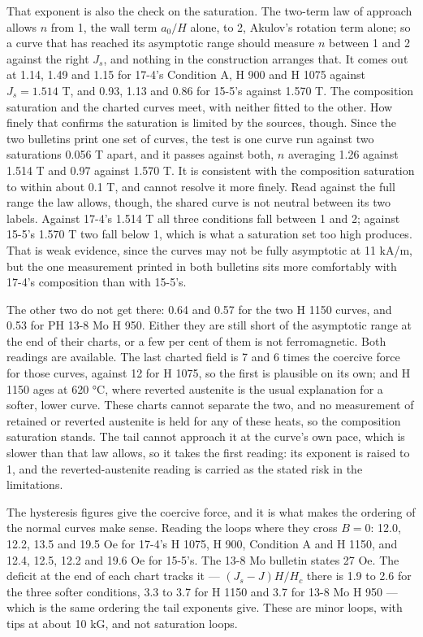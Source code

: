 \documentclass[
  11pt,
]{article}
\begin{document}
That exponent is also the check on the saturation. The two-term law of approach allows \(n\) from 1, the wall term \(a_0/H\) alone, to 2, Akulov's rotation term alone; so a curve that has reached its asymptotic range should measure \(n\) between 1 and 2 against the right \(J_s\), and nothing in the construction arranges that. It comes out at 1.14, 1.49 and 1.15 for 17-4's Condition A, H 900 and H 1075 against \(J_s = 1.514\) T, and 0.93, 1.13 and 0.86 for 15-5's against 1.570 T. The composition saturation and the charted curves meet, with neither fitted to the other. How finely that confirms the saturation is limited by the sources, though. Since the two bulletins print one set of curves, the test is one curve run against two saturations 0.056 T apart, and it passes against both, \(n\) averaging 1.26 against 1.514 T and 0.97 against 1.570 T. It is consistent with the composition saturation to within about 0.1 T, and cannot resolve it more finely. Read against the full range the law allows, though, the shared curve is not neutral between its two labels. Against 17-4's 1.514 T all three conditions fall between 1 and 2; against 15-5's 1.570 T two fall below 1, which is what a saturation set too high produces. That is weak evidence, since the curves may not be fully asymptotic at 11 kA/m, but the one measurement printed in both bulletins sits more comfortably with 17-4's composition than with 15-5's.

The other two do not get there: 0.64 and 0.57 for the two H 1150 curves, and 0.53 for PH 13-8 Mo H 950. Either they are still short of the asymptotic range at the end of their charts, or a few per cent of them is not ferromagnetic. Both readings are available. The last charted field is 7 and 6 times the coercive force for those curves, against 12 for H 1075, so the first is plausible on its own; and H 1150 ages at 620 °C, where reverted austenite is the usual explanation for a softer, lower curve. These charts cannot separate the two, and no measurement of retained or reverted austenite is held for any of these heats, so the composition saturation stands. The tail cannot approach it at the curve's own pace, which is slower than that law allows, so it takes the first reading: its exponent is raised to 1, and the reverted-austenite reading is carried as the stated risk in the limitations.

The hysteresis figures give the coercive force, and it is what makes the ordering of the normal curves make sense. Reading the loops where they cross \(B = 0\): 12.0, 12.2, 13.5 and 19.5 Oe for 17-4's H 1075, H 900, Condition A and H 1150, and 12.4, 12.5, 12.2 and 19.6 Oe for 15-5's. The 13-8 Mo bulletin states 27 Oe. The deficit at the end of each chart tracks it --- \((J_s - J)H/H_c\) there is 1.9 to 2.6 for the three softer conditions, 3.3 to 3.7 for H 1150 and 3.7 for 13-8 Mo H 950 --- which is the same ordering the tail exponents give. These are minor loops, with tips at about 10 kG, and not saturation loops.
\end{document}
